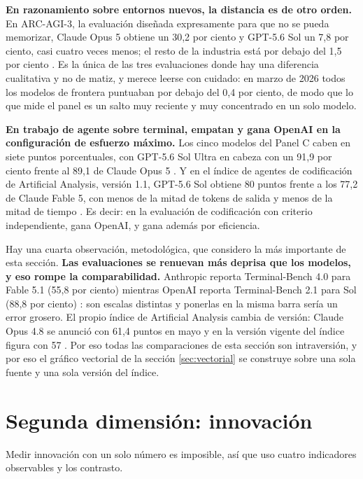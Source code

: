 \documentclass[11pt,letterpaper]{article}
\begin{document}
\textbf{En razonamiento sobre entornos nuevos, la distancia es de otro orden.}
En ARC-AGI-3, la evaluación diseñada expresamente para que no se pueda memorizar,
Claude Opus 5 obtiene un 30,2 por ciento y GPT-5.6 Sol un 7,8 por ciento, casi
cuatro veces menos; el resto de la industria está por debajo del 1,5 por ciento
\parencite{benchlm2026arc}. Es la única de las tres evaluaciones donde hay una
diferencia cualitativa y no de matiz, y merece leerse con cuidado: en marzo de
2026 todos los modelos de frontera puntuaban por debajo del 0,4 por ciento, de
modo que lo que mide el panel es un salto muy reciente y muy concentrado en un
solo modelo.

\textbf{En trabajo de agente sobre terminal, empatan y gana OpenAI en la
configuración de esfuerzo máximo.} Los cinco modelos del Panel C caben en siete
puntos porcentuales, con GPT-5.6 Sol Ultra en cabeza con un 91,9 por ciento
frente al 89,1 de Claude Opus 5 \parencite{openai2026sol,anthropic2026opus5}. Y
en el índice de agentes de codificación de Artificial Analysis, versión 1.1,
GPT-5.6 Sol obtiene 80 puntos frente a los 77,2 de Claude Fable 5, con menos de
la mitad de tokens de salida y menos de la mitad de tiempo
\parencite{wikipedia2026gpt56,aa2026gpt56}. Es decir: en la evaluación de
codificación con criterio independiente, gana OpenAI, y gana además por
eficiencia.

Hay una cuarta observación, metodológica, que considero la más importante de esta
sección. \textbf{Las evaluaciones se renuevan más deprisa que los modelos, y eso
rompe la comparabilidad.} Anthropic reporta Terminal-Bench 4.0 para Fable 5.1
(55,8 por ciento) mientras OpenAI reporta Terminal-Bench 2.1 para Sol (88,8 por
ciento) \parencite{anthropic2026fable51,openai2026sol}: son escalas distintas y
ponerlas en la misma barra sería un error grosero. El propio índice de
Artificial Analysis cambia de versión: Claude Opus 4.8 se anunció con 61,4 puntos
en mayo \parencite{aa2026opus48} y en la versión vigente del índice figura con 57
\parencite{aa2026comparacion}. Por eso todas las comparaciones de esta sección
son intraversión, y por eso el gráfico vectorial de la sección \ref{sec:vectorial} se construye
sobre una sola fuente y una sola versión del índice.

\section{Segunda dimensión: innovación}

Medir innovación con un solo número es imposible, así que uso cuatro
indicadores observables y los contrasto.
\end{document}
